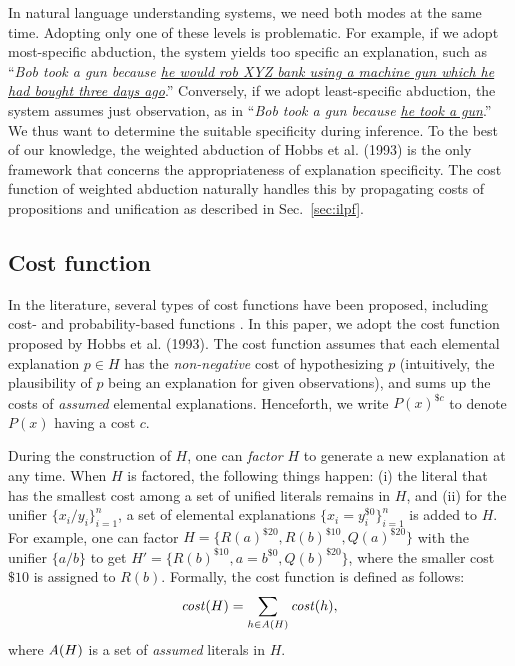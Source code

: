 \documentclass[english]{jnlp_1.4}
\begin{document}
In natural language understanding systems, we need both modes at the
same time. Adopting only one of these levels is problematic. For
example, if we adopt most-specific abduction, the system yields too
specific an explanation, 
    such as ``{\itshape Bob took a gun because \ul{he would rob \mbox{XYZ} bank using a machine gun which he had bought three days ago}}.'' 
Conversely, if we adopt
least-specific abduction, the system assumes just observation, 
    as in ``{\itshape Bob took a gun because \ul{he \mbox{took} a gun}}.'' 
We thus want to determine the suitable specificity during inference. To the
best of our knowledge, the weighted abduction of Hobbs et al.
(1993)\nocite{Hobbs93} is the only framework that concerns the appropriateness of
explanation specificity. The cost function of weighted abduction
\linebreak
naturally handles this by propagating costs of propositions and
unification as described in 
\linebreak
Sec.~\ref{sec:ilpf}.

\subsection{Cost function}
\label{sec:cfunc}

In the literature, several types of cost functions have been proposed,
including cost- and probability-based functions
\cite[etc.]{Charniak91,Poole93,Hobbs93,Raghavan10,Singla11}. In this
paper, we adopt the cost function proposed by Hobbs et
al. (1993)\nocite{Hobbs93}. The cost function assumes that each
elemental explanation $p \in H$ has the \emph{non-negative} cost of
hypothesizing $p$ (intuitively, the plausibility of $p$ being an explanation for given
observations), and sums up the costs of \emph{assumed} elemental
explanations. Henceforth, we write $P(x)^{\$c}$ to denote $P(x)$
having a cost $c$.

During the construction of $H$, one can \emph{factor} $H$ to generate
a new explanation at any time. When $H$ is factored, the following
things happen: (i) the literal that has the smallest cost among a set
of unified literals remains in $H$, and (ii) for the unifier
$\{x_i/y_i\}_{i=1}^{n}$, a set of elemental explanations
$\{x_i=y_i^{\$0}\}_{i=1}^n$ is added to $H$. For example, one can
factor $H=\{R(a)^{\$20}, R(b)^{\$10}, Q(a)^{\$20}\}$ with the unifier
$\{a/b\}$ to get $H' = \{R(b)^{\$10}, a=b^{\$0}, Q(b)^{\$20}\}$, where
the smaller cost $\$10$ is assigned to $R(b)$. Formally, the cost
function is defined as follows:
\begin{equation}
  \mathit{cost}(H) = \sum_{h \in \emph{A}(H)} \mathit{cost}(h),
\end{equation}
where $\emph{A}(H)$ is a set of \emph{assumed} literals in
$H$.
\end{document}
